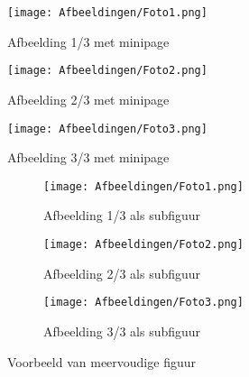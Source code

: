 \begin{figure}[p]
    \centering                          %
    \begin{minipage}{0.95\textwidth}    %
        \centering                      %
        \texttt{[image: Afbeeldingen/Foto1.png]}
        \caption{Afbeelding 1/3 met minipage}
        \label{fig:multi_mini1}
    \end{minipage}
    \begin{minipage}{0.45\textwidth}
        \centering
        \texttt{[image: Afbeeldingen/Foto2.png]}
        \caption{Afbeelding 2/3 met minipage}
        \label{fig:multi_mini2}
    \end{minipage} %
    \begin{minipage}{0.45\textwidth}
        \centering
        \texttt{[image: Afbeeldingen/Foto3.png]}
        \caption{Afbeelding 3/3 met minipage}
        \label{fig:multi_mini3}
    \end{minipage}
\end{figure}

\begin{figure}[p]
    \centering
    \begin{subfigure}{0.95\textwidth}
        \centering
        \texttt{[image: Afbeeldingen/Foto1.png]}
        \caption{Afbeelding 1/3 als subfiguur}
        \label{fig:subfig1}
    \end{subfigure}
    
    \begin{subfigure}{0.45\textwidth}
        \centering
        \texttt{[image: Afbeeldingen/Foto2.png]}
        \caption{Afbeelding 2/3 als subfiguur}
        \label{fig:subfig2}
    \end{subfigure} %
    \begin{subfigure}{0.45\textwidth}
        \centering
        \texttt{[image: Afbeeldingen/Foto3.png]}
        \caption{Afbeelding 3/3 als subfiguur}
        \label{fig:subfig3}
    \end{subfigure}
    \caption{Voorbeeld van meervoudige figuur}
    \label{fig:subfig}
\end{figure}



